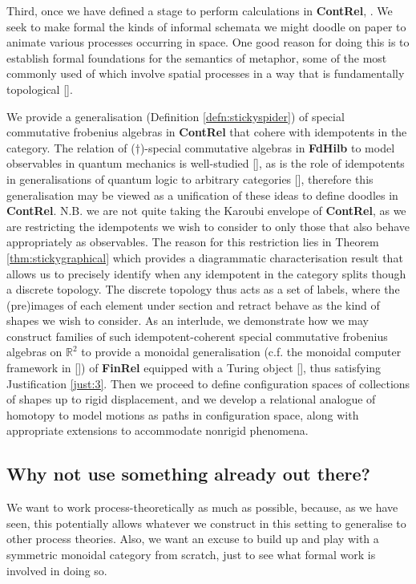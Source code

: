 Third, once we have defined a stage to perform calculations in \textbf{ContRel}, . We seek to make formal the kinds of informal schemata we might doodle on paper to animate various processes occurring in space. One good reason for doing this is to establish formal foundations for the semantics of metaphor, some of the most commonly used of which involve spatial processes in a way that is fundamentally topological []. 



We provide a generalisation (Definition \ref{defn:stickyspider}) of special commutative frobenius algebras in \textbf{ContRel} that cohere with idempotents in the category. The relation of ($\dagger$)-special commutative algebras in \textbf{FdHilb} to model observables in quantum mechanics is well-studied [], as is the role of idempotents in generalisations of quantum logic to arbitrary categories [], therefore this generalisation may be viewed as a unification of these ideas to define doodles in \textbf{ContRel}. N.B. we are not quite taking the Karoubi envelope of \textbf{ContRel}, as we are restricting the idempotents we wish to consider to only those that also behave appropriately as observables. The reason for this restriction lies in Theorem \ref{thm:stickygraphical} which provides a diagrammatic characterisation result that allows us to precisely identify when any idempotent in the category splits though a discrete topology. The discrete topology thus acts as a set of labels, where the (pre)images of each element under section and retract behave as the kind of shapes we wish to consider. As an interlude, we demonstrate how we may construct families of such idempotent-coherent special commutative frobenius algebras on $\mathbb{R}^2$ to provide a monoidal generalisation (c.f. the monoidal computer framework in []) of \textbf{FinRel} equipped with a Turing object [], thus satisfying Justification \ref{just:3}. Then we proceed to define configuration spaces of collections of shapes up to rigid displacement, and we develop a relational analogue of homotopy to model motions as paths in configuration space, along with appropriate extensions to accommodate nonrigid phenomena.

\subsection{Why not use something already out there?}

 We want to work process-theoretically as much as possible, because, as we have seen, this potentially allows whatever we construct in this setting to generalise to other process theories. Also, we want an excuse to build up and play with a symmetric monoidal category from scratch, just to see what formal work is involved in doing so.

